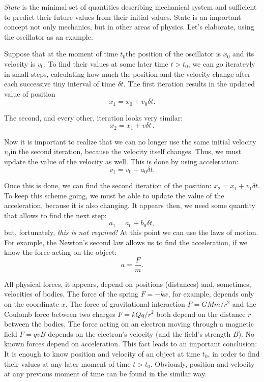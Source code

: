 \emph{State} is the minimal set of quantities describing mechanical
system and sufficient to predict
their future values from their initial values. State is an important
concept not only mechanics, but in other areas of physics.
Let's elaborate, using the oscillator as an example.

Suppose that at the moment of time $t_{0}$the position of the oscillator
is $x_{0}$ and its velocity is $v_{0}$. To find their values at
some later time $t>t_{0}$, we can go iteratevly in small steps, calculating
how much the position and the velocity change after each successive
tiny interval of time $\delta t$. The first iteration results in
the updated value of position
\begin{equation}
	x_{1}=x_{0}+v_{0}\delta t.
\end{equation}

The second, and every other, iteration looks very similar:
\begin{equation}
	x_{2}=x_{1}+v\delta t\,.
\end{equation}

Now it is important to realize that we can no longer use the same initial
velocity $v_{0}$in the second iteration, because the velocity itself
changes. Thus, we must update the value of the velocity as well. This
is done by using acceleration:
\begin{equation}
	v_{1}=v_{0}+a_{0}\delta t.
\end{equation}

Once this is done, we can find the second iteration of the position:
$x_{2}=x_{1}+v_{1}\delta t$. To keep this scheme going, we must be
able to update the value of the acceleration, because it is also changing.
It appears then, we need some quantity that allows to find the next
step:
\begin{equation}
	a_{1}=a_{0}+b_{0}\delta t,
\end{equation}
but, fortunately, \emph{this is not required!} At this point we can use the laws of motion.
For example, the Newton's second law allows us to find the acceleration,
if we know the force acting on the object:
\begin{equation}
	a=\frac{F}{m}.
\end{equation}

All physical forces, it appears, depend on positions (distances) and,
sometimes, velocities of bodies. The force of the spring $F=-kx$, for example,
depends only on the coordinate $x$. The force of gravitational interaction $F=GMm/r^2$
and the Coulomb force between two charges $F=kQq/r^2$ both depend on the distance
$r$ between the bodies. The force acting on an electron moving through
a magnetic field $F=qvB$ depends on the electron's velocity (and the field's strength $B$). 
No known forces depend on acceleration. This fact leads to an important conclusion:
It is enough to know position and velocity of an object at time $t_{0}$,
in order to find their values at any later moment of time $t>t_{0}$.
Obviously, position and velocity at any previous moment of time can
be found in the similar way.

